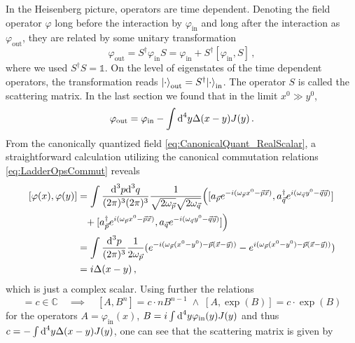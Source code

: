 In the Heisenberg picture, operators are time dependent. Denoting the field operator $\varphi$ long before the interaction by $\varphi_{\text{in}}$ and long after the interaction as $\varphi_{\text{out}}$, they are related by some unitary transformation
\begin{equation}
    \varphi_{\text{out}}=S^\dagger \varphi_{\text{in}}S=\varphi_{\text{in}}+S^\dagger[\varphi_{\text{in}},S]\,,
\end{equation}
where we used ${S^\dagger S=\mathbb{1}}$. On the level of eigenstates of the time dependent operators, the transformation reads ${{\lvert\cdot\rangle}_{\text{out}}=S^\dagger{\lvert\cdot\rangle}_{\text{in}}}$. The operator $S$ is called the scattering matrix. In the last section we found that in the limit ${x^0\gg y^0}$,
\begin{equation}
    \varphi_{\text{out}}=\varphi_{\text{in}}-\int\text{d}^4y\Delta(x-y)J(y)\,.
\end{equation}
From the canonically quantized field \eqref{eq:CanonicalQuant_RealScalar}, a straightforward calculation utilizing the canonical commutation relations \eqref{eq:LadderOpsCommut} reveals
\begin{subequations}
    \begin{align}
        [\varphi(x),\varphi(y)]&=\int\frac{\text{d}^3p\text{d}^3q}{(2\pi)^3(2\pi)^3}\frac{1}{\sqrt{2\omega_{\vec{p}}}\sqrt{2\omega_{\vec{q}}}}\Big([a_{\vec{p}}e^{-{i}(\omega_{\vec{p}}x^0-\vec{p}\vec{x})},a_{\vec{q}}^\dagger e^{{i}(\omega_{\vec{q}}y^0-\vec{q}\vec{y})}]\\
        &\phantom{=}+[a_{\vec{p}}^\dagger e^{{i}(\omega_{\vec{p}}x^0-\vec{p}\vec{x})},a_{\vec{q}} e^{-{i}(\omega_{\vec{q}}y^0-\vec{q}\vec{y})}]\Big)\\
        &=\int\frac{\text{d}^3p}{(2\pi)^3}\frac{1}{2\omega_{\vec{p}}}(e^{-{i}(\omega_{\vec{p}}(x^0-y^0)-\vec{p}(\vec{x}-\vec{y}))}-e^{{i}(\omega_{\vec{p}}(x^0-y^0)-\vec{p}(\vec{x}-\vec{y}))})\\
        &={i}\Delta(x-y)\,,
    \end{align}
\end{subequations}
which is just a complex scalar. Using further the relations
\begin{equation}
    [A,B]=c\in\mathbb{C}\quad\implies\quad[A,B^n]=c\cdot nB^{n-1}\;\wedge\;[A,\exp(B)]=c\cdot\exp(B)
\end{equation}
for the operators ${A=\varphi_{\text{in}}(x)}$, ${B={i}\int\text{d}^4y\varphi_{\text{in}}(y)J(y)}$ and thus ${c=-\int\text{d}^4y\Delta(x-y)J(y)}$, one can see that the scattering matrix is given by
